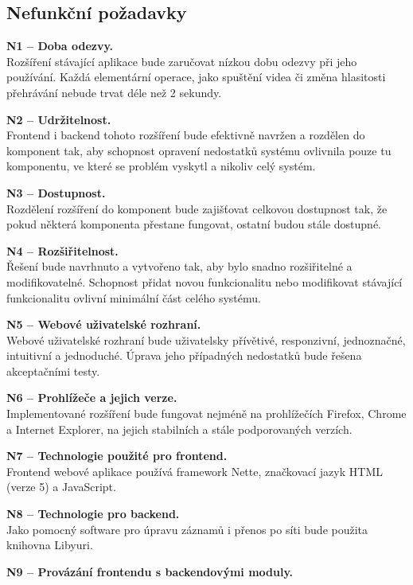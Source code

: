 \documentclass[thesis=M,czech]{FITthesis}[2012/06/26]
\begin{document}
\subsection{Nefunkční požadavky} \label{subsec:analyza_np}
  \begin{description}
    \item \textbf{N1 -- Doba odezvy.\\}
    Rozšíření stávající aplikace bude zaručovat nízkou dobu odezvy při jeho používání. Každá elementární operace, jako spuštění videa či změna hlasitosti přehrávání nebude trvat déle než 2 sekundy.
    \item \textbf{N2 -- Udržitelnost.\\}
	Frontend i backend tohoto rozšíření bude efektivně navržen a rozdělen do komponent tak, aby schopnost opravení nedostatků systému ovlivnila pouze tu komponentu, ve které se problém vyskytl a nikoliv celý systém.
    \item \textbf{N3 -- Dostupnost.\\}
	Rozdělení rozšíření do komponent bude zajišťovat celkovou dostupnost tak, že pokud některá komponenta přestane fungovat, ostatní budou stále dostupné.
    \item \textbf{N4 -- Rozšiřitelnost.\\}
	Řešení bude navrhnuto a vytvořeno tak, aby bylo snadno rozšiřitelné a modifikovatelné. Schopnost přidat novou funkcionalitu nebo modifikovat stávající funkcionalitu ovlivní minimální část celého systému.
    \item \textbf{N5 -- Webové uživatelské rozhraní.\\}
	Webové uživatelské rozhraní bude uživatelsky přívětivé, responzivní, jednoznačné, intuitivní a jednoduché. Úprava jeho případných nedostatků bude řešena akceptačními testy.
    \item \textbf{N6 -- Prohlížeče a jejich verze.\\}
	Implementované rozšíření bude fungovat nejméně na prohlížečích Firefox, Chrome a Internet Explorer, na jejich stabilních a stále podporovaných verzích.
    \item \textbf{N7 -- Technologie použité pro frontend.\\}
	Frontend webové aplikace používá framework Nette, značkovací jazyk HTML (verze 5) a JavaScript.
    \item \textbf{N8 -- Technologie pro backend.\\}
	Jako pomocný software pro úpravu záznamů i přenos po síti bude použita knihovna Libyuri.
    \item \textbf{N9 -- Provázání frontendu s backendovými moduly.\\}

\end{description}
\end{document}
